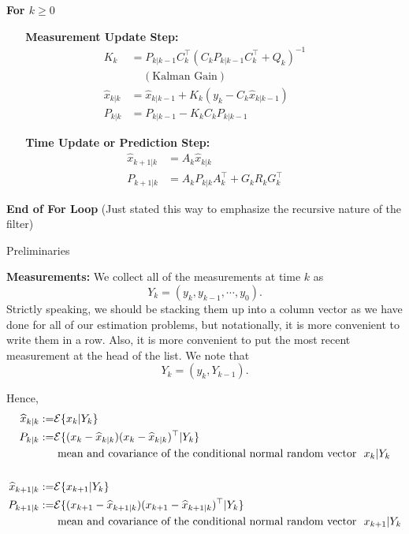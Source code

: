 \documentclass[letterpaper]{article}
\newcommand{\ExpectofGiven}[2]{{\cal E} \{ #1 | #2 \}}
\begin{document}
\textbf{For $k \ge 0$}

\textbf{~~~Measurement Update Step:}
\begin{align*}
K_k &= P_{k|k-1}C_k^\top \left(C_k P_{k|k-1} C_k^\top + Q_k\right)^{-1} \\
& ~~~~~(\text{Kalman Gain})\\
\widehat{x}_{k|k} &= \widehat{x}_{k|k-1}  + K_k \left( y_k - C_k \widehat{x}_{k|k-1} \right) \\
P_{k|k} &= P_{k|k-1} - K_k C_k  P_{k|k-1}
\end{align*}

\textbf{~~~Time Update or Prediction Step:}
\begin{align*}
\widehat{x}_{k+1|k} &= A_k \widehat{x}_{k|k}  \\
P_{k+1|k} &= A_k P_{k|k} A_k^\top + G_k R_k G_k^\top
\end{align*}

\textbf{End of For Loop} (Just stated this way to emphasize the recursive nature of the filter)

 \newpage

  {\Large \bf
\begin{center}
 Preliminaries
\end{center}
}

 \noindent \textbf{Measurements:} We collect all of the measurements at time $k$ as
 $$Y_k = (y_k, y_{k-1}, \cdots, y_0).$$
 Strictly speaking, we should be stacking them up into a column vector as we have done for all of our estimation problems, but notationally, it is more convenient to write them in a row.  Also, it is more convenient to put the most recent measurement at the head of the list. We note that
 $$Y_k = ( y_k, Y_{k-1}).$$

 Hence,
\begin{align*}
\widehat{x}_{k|k} :=& \ExpectofGiven{x_k}{Y_k}\\
P_{k|k} :=& \ExpectofGiven{(x_k-\widehat{x}_{k|k})(x_k-\widehat{x}_{k|k})^\top}{Y_k}\\
&~ \text{mean and covariance of the conditional normal random vector} ~~x_{k} | Y_k\\
& \\
\widehat{x}_{k+1|k} := &\ExpectofGiven{ x_{k+1} }{ Y_k}\\
P_{k+1|k}:=& \ExpectofGiven{(x_{k+1}-\widehat{x}_{k+1|k})(x_{k+1}-\widehat{x}_{k+1|k})^\top}{Y_k}\\
&~ \text{mean and covariance of the conditional normal random vector} ~~x_{k+1} | Y_k\\
\end{align*}
\end{document}
